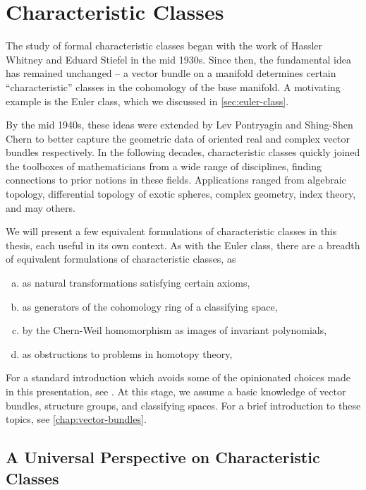 \pagebreak
\section{Characteristic Classes}\label{sec:characteristic-classes}
The study of formal characteristic classes began with the work of Hassler Whitney and Eduard Stiefel in the mid 1930s. Since then, the fundamental idea has remained unchanged -- a vector bundle on a manifold determines certain ``characteristic'' classes in the cohomology of the base manifold. A motivating example is the Euler class, which we discussed in \cref{sec:euler-class}.


By the mid 1940s, these ideas were extended by Lev Pontryagin and Shing-Shen Chern to better capture the geometric data of oriented real and complex vector bundles respectively. In the following decades, characteristic classes quickly joined the toolboxes of mathematicians from a wide range of disciplines, finding connections to prior notions in these fields.
Applications ranged from algebraic topology, differential topology of exotic spheres, complex geometry, index theory, and may others.

We will present a few equivalent formulations of characteristic classes in this thesis, each useful in its own context. 
As with the Euler class, there are a breadth of equivalent formulations of characteristic classes, as
\begin{enumerate}[(a)]
	\item as natural transformations satisfying certain axioms,
	\item as generators of the cohomology ring of a classifying space,
	\item by the Chern-Weil homomorphism as images of invariant polynomials,
	\item as obstructions to problems in homotopy theory,
\end{enumerate}

For a standard introduction which avoids some of the opinionated choices made in this presentation, see \cite{milnorstasheff1974}.
At this stage, we assume a basic knowledge of vector bundles, structure groups, and classifying spaces. For a brief introduction to these topics, see \cref{chap:vector-bundles}.

\subsection{A Universal Perspective on Characteristic Classes}\label{sec:axiomatic-characteristic-classes}

